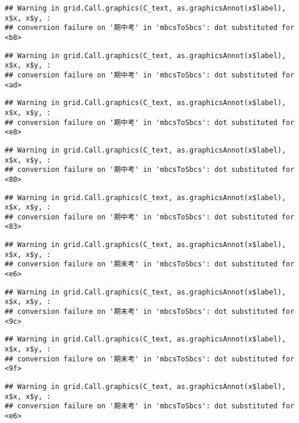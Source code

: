 \documentclass[
]{book}
\begin{document}
\begin{verbatim}
## Warning in grid.Call.graphics(C_text, as.graphicsAnnot(x$label), x$x, x$y, :
## conversion failure on '期中考' in 'mbcsToSbcs': dot substituted for <b8>
\end{verbatim}

\begin{verbatim}
## Warning in grid.Call.graphics(C_text, as.graphicsAnnot(x$label), x$x, x$y, :
## conversion failure on '期中考' in 'mbcsToSbcs': dot substituted for <ad>
\end{verbatim}

\begin{verbatim}
## Warning in grid.Call.graphics(C_text, as.graphicsAnnot(x$label), x$x, x$y, :
## conversion failure on '期中考' in 'mbcsToSbcs': dot substituted for <e8>
\end{verbatim}

\begin{verbatim}
## Warning in grid.Call.graphics(C_text, as.graphicsAnnot(x$label), x$x, x$y, :
## conversion failure on '期中考' in 'mbcsToSbcs': dot substituted for <80>
\end{verbatim}

\begin{verbatim}
## Warning in grid.Call.graphics(C_text, as.graphicsAnnot(x$label), x$x, x$y, :
## conversion failure on '期中考' in 'mbcsToSbcs': dot substituted for <83>
\end{verbatim}

\begin{verbatim}
## Warning in grid.Call.graphics(C_text, as.graphicsAnnot(x$label), x$x, x$y, :
## conversion failure on '期末考' in 'mbcsToSbcs': dot substituted for <e6>
\end{verbatim}

\begin{verbatim}
## Warning in grid.Call.graphics(C_text, as.graphicsAnnot(x$label), x$x, x$y, :
## conversion failure on '期末考' in 'mbcsToSbcs': dot substituted for <9c>
\end{verbatim}

\begin{verbatim}
## Warning in grid.Call.graphics(C_text, as.graphicsAnnot(x$label), x$x, x$y, :
## conversion failure on '期末考' in 'mbcsToSbcs': dot substituted for <9f>
\end{verbatim}

\begin{verbatim}
## Warning in grid.Call.graphics(C_text, as.graphicsAnnot(x$label), x$x, x$y, :
## conversion failure on '期末考' in 'mbcsToSbcs': dot substituted for <e6>
\end{verbatim}
\end{document}
